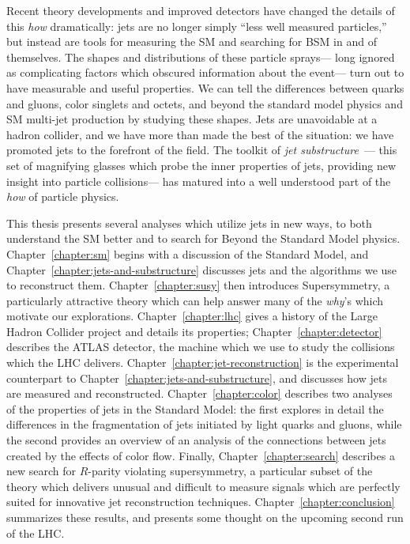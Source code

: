 Recent theory developments and improved detectors have changed the details of this \textit{how} dramatically: jets are no longer simply ``less well measured particles,'' but instead are tools for measuring the SM and searching for BSM in and of themselves. The shapes and distributions of these particle sprays--- long ignored as complicating factors which obscured information about the event--- turn out to have measurable and useful properties. We can tell the differences between quarks and gluons, color singlets and octets, and beyond the standard model physics and SM multi-jet production by studying these shapes. Jets are unavoidable at a hadron collider, and we have more than made the best of the situation: we have promoted jets to the forefront of the field. The toolkit of \textit{jet substructure}~\cite{Abdesselam:2010pt,Altheimer:2012mn,Altheimer:2013yza,Adams:2015hiv}--- this set of magnifying glasses which probe the inner properties of jets, providing new insight into particle collisions--- has matured into a well understood part of the \textit{how} of particle physics.



This thesis presents several analyses which utilize jets in new ways, to both understand the SM better and to search for Beyond the Standard Model physics.  Chapter~\ref{chapter:sm} begins with a discussion of the Standard Model, and Chapter~\ref{chapter:jets-and-substructure} discusses jets and the algorithms we use to reconstruct them. Chapter~\ref{chapter:susy} then introduces Supersymmetry, a particularly attractive theory which can help answer many of the \textit{why}'s which motivate our explorations. Chapter~\ref{chapter:lhc} gives a history of the Large Hadron Collider project and details its properties; Chapter~\ref{chapter:detector} describes the ATLAS detector, the machine which we use to study the collisions which the LHC delivers. Chapter~\ref{chapter:jet-reconstruction} is the experimental counterpart to Chapter~\ref{chapter:jets-and-substructure}, and discusses how jets are measured and reconstructed. Chapter~\ref{chapter:color} describes two analyses of the properties of jets in the Standard Model: the first explores in detail the differences in the fragmentation of jets initiated by light quarks and gluons, while the second provides an overview of an analysis of the connections between jets created by the effects of color flow. Finally, Chapter~\ref{chapter:search} describes a new search for $R$-parity violating supersymmetry, a particular subset of the theory which delivers unusual and difficult to measure signals which are perfectly suited for innovative jet reconstruction techniques. Chapter~\ref{chapter:conclusion} summarizes these results, and presents some thought on the upcoming second run of the LHC.